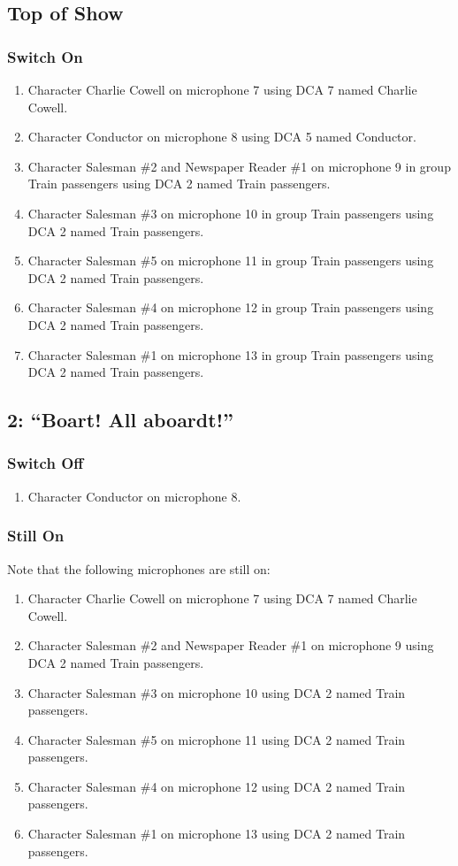 \subsection* {Top of Show}
\subsubsection* {Switch On}
\begin{enumerate}
\item Character Charlie Cowell on microphone 7 using DCA 7 named Charlie Cowell.
\item Character Conductor on microphone 8 using DCA 5 named Conductor.
\item Character Salesman \#2 and Newspaper Reader \#1 on microphone 9 in group Train passengers using DCA 2 named Train passengers.
\item Character Salesman \#3 on microphone 10 in group Train passengers using DCA 2 named Train passengers.
\item Character Salesman \#5 on microphone 11 in group Train passengers using DCA 2 named Train passengers.
\item Character Salesman \#4 on microphone 12 in group Train passengers using DCA 2 named Train passengers.
\item Character Salesman \#1 on microphone 13 in group Train passengers using DCA 2 named Train passengers.
\end{enumerate}
\subsection* {2: ``Boart!  All aboardt!''}
\subsubsection* {Switch Off}
\begin{enumerate}
\item Character Conductor on microphone 8.
\end{enumerate}
\subsubsection* {Still On}
Note that the following microphones are still on:
\begin{enumerate}
\item Character Charlie Cowell on microphone 7 using DCA 7 named Charlie Cowell.
\item Character Salesman \#2 and Newspaper Reader \#1 on microphone 9 using DCA 2 named Train passengers.
\item Character Salesman \#3 on microphone 10 using DCA 2 named Train passengers.
\item Character Salesman \#5 on microphone 11 using DCA 2 named Train passengers.
\item Character Salesman \#4 on microphone 12 using DCA 2 named Train passengers.
\item Character Salesman \#1 on microphone 13 using DCA 2 named Train passengers.
\end{enumerate}

